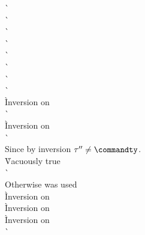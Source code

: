 \begin{description}
\begin{tabbing}
      \`  \\
      \`  \\
      \`  \\
      \`  \\
      \`  \\
      \`  \\
      \`  \\
      \`  \\
      \` Inversion on  \\
      \`  \\
      \` Inversion on  \\
      \`  \\
    Since  by inversion $\tau'' \not= \commandty$. \\
      \` Vacuously true \\
      \`  \- \\
  Otherwise  \+ was used \\
      \` Inversion on  \\
      \` Inversion on  \\

      \` Inversion on  \\
      \`  \\


\end{tabbing}
\end{description}

